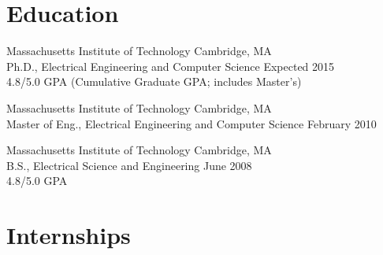 \documentclass[margin]{res}
\begin{document}
\begin{resume}

\section{Education} 
Massachusetts Institute of Technology \hfill Cambridge, MA \\
Ph.D., Electrical Engineering and Computer Science \hfill Expected 2015\\
4.8/5.0 GPA (Cumulative Graduate GPA; includes Master's)

Massachusetts Institute of Technology \hfill Cambridge, MA \\
Master of Eng., Electrical Engineering and Computer Science \hfill February 2010

Massachusetts Institute of Technology \hfill Cambridge, MA \\
B.S., Electrical Science and Engineering \hfill June 2008 \\
4.8/5.0 GPA

\section{Internships}


\end{resume}
\end{document}
